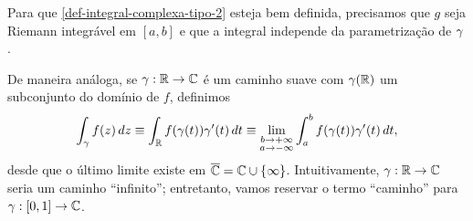         Para que \eqref{def-integral-complexa-tipo-2} esteja bem definida, precisamos que
        $g$ seja Riemann integrável em $[a,b]$ e que a integral independe da parametrização
        de $\gamma$.
        
        De maneira análoga, se $\gamma:\mathbb{R}\to\mathbb{C}$ é um caminho suave com $\gamma(\mathbb{R})$ um
        subconjunto do domínio de $f$, definimos
        \begin{align*}
            \int_{\gamma} f(z) \, dz \equiv \int_{\mathbb{R}} f(\gamma(t))\gamma'(t) \, dt
                                     \equiv \lim_{\substack{b\to +\infty \\ a\to -\infty}} 
                                     \int_a^b f(\gamma(t))\gamma'(t) \, dt,
        \end{align*}
        desde que o último limite existe em $\overline{\mathbb{C}} = \mathbb{C}\cup\{\infty\}$. Intuitivamente,
        $\gamma:\mathbb{R}\to\mathbb{C}$ seria um caminho ``infinito''; entretanto, vamos reservar o termo ``caminho''
        para $\gamma:[0,1]\to\mathbb{C}$.
        
